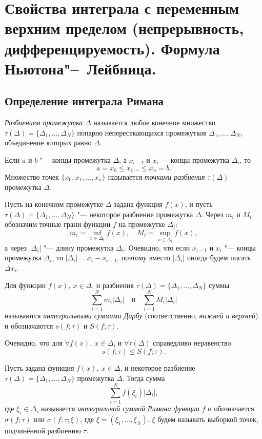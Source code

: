 \chapter[Свойства интеграла с переменным верхним пределом (непрерывность, дифференцируемость). Формула Ньютона"--~Лейбница.]{Свойства интеграла с переменным верхним пределом (непрерывность, дифференцируемость). Формула Ньютона"--~Лейбница.}
\section{Определение интеграла Римана}

\begin{defn}
\textit{Разбиением промежутка} $\Delta$ называется любое конечное множество $\tau(\Delta) = \{ \Delta_1, \ldots, \Delta_N\}$ попарно непересекающихся промежутков $\Delta_1, \ldots, \Delta_N$, объединение которых равно $\Delta$.

Если $a$ и $b$ "--- концы промежутка  $\Delta$, а $x_{i-1}$ и $x_{i}$ — концы промежутка $\Delta_i$, то
$$
a=x_0\le x_1\ldots \le x_n=b.
$$
Множество точек $\{x_0,x_1,\dots,x_n\}$ называется \textit{точками разбиения} $\tau(\Delta)$ промежутка $\Delta$.
\end{defn}

Пусть на конечном промежутке $\Delta$ задана функция $f(x)$, и пусть $\tau(\Delta) = \{ \Delta_1, \ldots, \Delta_N\}$ "--- некоторое разбиение промежутка $\Delta$. 
Через $m_i$ и $M_i$ обозначим точные грани функции $f$ на промежутке $\Delta_i$:
$$
m_i = \inf_{x \in \Delta_i} f(x), \quad M_i = \sup_{x \in \Delta_i} f(x),
$$ 
 а через $|\Delta_i|$ "--- длину промежутка $\Delta_i$. Очевидно, что если $x_{i-1}$ и $x_i$ "--- концы промежутка $\Delta_i$, то $|\Delta_i|=x_i-x_{i-1}$, поэтому вместо $|\Delta_i|$ иногда будем писать $\Delta x_i$. 

\begin{defn}
Для функции $f(x), \ x \in \Delta$, и разбиения $\tau(\Delta) = \{ \Delta_1, \ldots, \Delta_N\}$ суммы 
$$
\sum_{i = 1}^{N}m_i|\Delta_i| \quad \text{и} \quad \sum_{i = 1}^{N}M_i|\Delta_i|
$$
называются \textit{интегральными суммами Дарбу} (соответственно, \textit{нижней и верхней}) и обозначаются $s(f; \tau)$ и $S(f; \tau)$.
\end{defn}

Очевидно, что для $\forall f(x), \ x \in \Delta$, и $\forall \tau(\Delta)$ справедливо неравенство 
$$
s(f; \tau) \le S(f; \tau).
$$

\begin{defn}
Пусть задана функция $f(x), \ x \in \Delta$, и некоторое разбиение $\tau(\Delta) = \{ \Delta_1, \ldots, \Delta_N\}$ промежутка $\Delta$. Тогда сумма
$$
\sum_{i = 1}^{N} f(\xi_i)|\Delta_i|,
$$
где $\xi_i \in \Delta_i$ называется \textit{интегральной суммой Римана функции $f$} и обозначается $\sigma(f; \tau)$ или $\sigma(f; \tau; \xi)$, где $\xi = (\xi_1, \ldots, \xi_N)$. $\xi$ будем называть выборкой точек, подчинённой разбиению $\tau$.
\end{defn}

